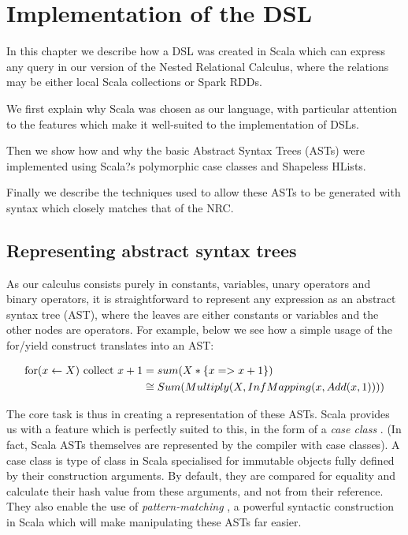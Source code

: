 \chapter{Implementation of the DSL}

In this chapter we describe how a DSL was created in Scala which can express any query in our version of the Nested Relational Calculus, where the relations may be either local Scala collections or Spark RDDs.

We first explain why Scala was chosen as our language, with particular attention to the features which make it well-suited to the implementation of DSLs.

Then we show how and why the basic Abstract Syntax Trees (ASTs) were implemented using Scala?s polymorphic case classes and Shapeless HLists.

Finally we describe the techniques used to allow these ASTs to be generated with syntax which closely matches that of the NRC.

\section{Representing abstract syntax trees}

As our calculus consists purely in constants, variables, unary operators and binary operators, it is straightforward to represent any expression as an abstract syntax tree (AST), where the leaves are either constants or variables and the other nodes are operators. For example, below we see how a simple usage of the for/yield construct translates into an AST:

\begin{equation*}
\begin{split}
\textrm{for}(x \leftarrow X) \textrm{ collect } x + 1 &= sum(X*\{x => x + 1\}) \\
&\cong Sum(Multiply(X,InfMapping(x,Add(x,1))))
\end{split}
\end{equation*}

The core task is thus in creating a representation of these ASTs. Scala provides us with a feature which is perfectly suited to this, in the form of a \textit{case class} \cite{caseclass}. (In fact, Scala ASTs themselves are represented by the compiler with case classes\cite{compilerasts}). A case class is type of class in Scala specialised for immutable objects fully defined by their construction arguments. By default, they are compared for equality and calculate their hash value from these arguments, and not from their reference. They also enable the use of \textit{pattern-matching} \cite{patternmatch}, a powerful syntactic construction in Scala which will make manipulating these ASTs far easier.

